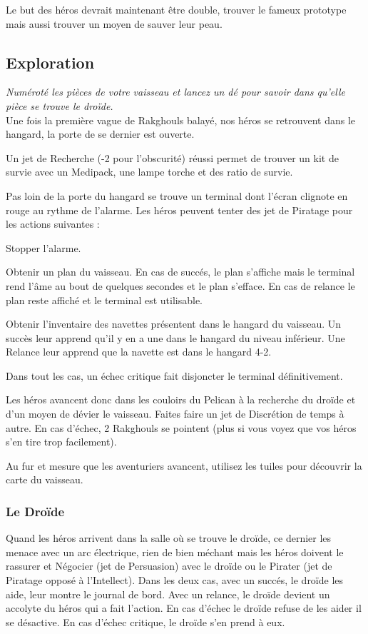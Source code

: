 \documentclass{jdrp}
\begin{document}
Le but des héros devrait maintenant être double, trouver le fameux prototype mais aussi trouver un moyen de sauver leur peau. 

\subsection{Exploration}
\emph{Numéroté les pièces de votre vaisseau et lancez un dé pour savoir dans qu'elle pièce se trouve le droïde.}\\

Une fois la première vague de Rakghouls balayé, nos héros se retrouvent dans le hangard, la porte de se dernier est ouverte.

Un jet de Recherche (-2 pour l'obscurité) réussi permet de trouver un kit de survie avec un Medipack, une lampe torche et des ratio de survie.

Pas loin de la porte du hangard se trouve un terminal dont l'écran clignote en rouge au rythme de l'alarme. Les héros peuvent tenter des jet de Piratage pour les actions suivantes :
\begin{rebelist}
	\item Stopper l'alarme. 
	\item Obtenir un plan du vaisseau. En cas de succés, le plan s'affiche mais le terminal rend l'âme au bout de quelques secondes et le plan s'efface. En cas de relance le plan reste affiché et le terminal est utilisable.
	\item  Obtenir l'inventaire des navettes présentent dans le hangard du vaisseau. Un succès leur apprend qu'il y en a une dans le hangard du niveau inférieur. Une Relance leur apprend que la navette est dans le hangard 4-2.
\end{rebelist}
Dans tout les cas, un échec critique fait disjoncter le terminal définitivement.

Les héros avancent donc dans les couloirs du Pelican à la recherche du droïde et d'un moyen de dévier le vaisseau. Faites faire un jet de Discrétion de temps à autre. En cas d'échec, 2 Rakghouls se pointent (plus si vous voyez que vos héros s'en tire trop facilement).

Au fur et mesure que les aventuriers avancent, utilisez les tuiles pour découvrir la carte du vaisseau.

\subsubsection{Le Droïde}
Quand les héros arrivent dans la salle où se trouve le droïde, ce dernier les menace avec un arc électrique, rien de bien méchant mais les héros doivent le rassurer et Négocier (jet de Persuasion) avec le droïde ou le Pirater (jet de Piratage opposé à l'Intellect). Dans les deux cas, avec un succés, le droïde les aide, leur montre le journal de bord. Avec un relance, le droïde devient un accolyte du héros qui a fait l'action. En cas d'échec le droïde refuse de les aider il se désactive. En cas d'échec critique, le droïde s'en prend à eux.
\end{document}
